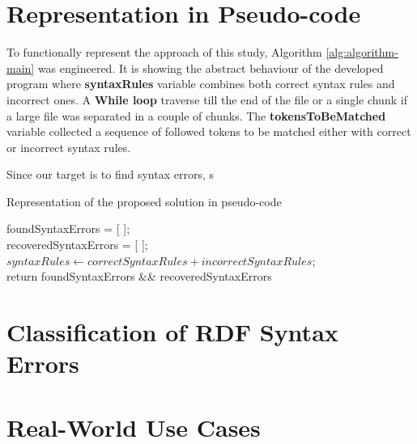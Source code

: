 \section{Representation in Pseudo-code}
To functionally represent the approach of this study, Algorithm \ref{alg:algorithm-main} was engineered. It is showing the abstract behaviour of the developed program where \textbf{syntaxRules} variable combines both correct syntax rules and incorrect ones. A \textbf{While loop} traverse till the end of the file or a single chunk if a large file was separated in a couple of chunks. The \textbf{tokensToBeMatched}  variable collected a sequence of followed tokens to be matched either with correct or incorrect syntax rules.

	\vspace{5mm} %
Since our target is to find syntax errors,  s
	\vspace{5mm} %

\begin{algorithm}[H] 
 \caption{Representation of the proposed solution  in pseudo-code}
 \label{alg:algorithm-main}

foundSyntaxErrors = [ ];\\
recoveredSyntaxErrors = [ ];\\
$syntaxRules \leftarrow correctSyntaxRules + incorrectSyntaxRules;$\\
return foundSyntaxErrors \&\& recoveredSyntaxErrors
\end{algorithm}


\section{Classification of RDF Syntax Errors}

\section{Real-World Use Cases}

 
